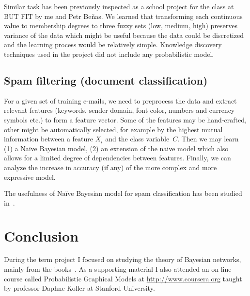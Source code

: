 \documentclass[english,cover]{fitthesis} %
\newcommand{\todo}[1]{{\color{red}#1}}
\begin{document}
Similar task has been previously inspected as a school project for the  class at BUT FIT by me and Petr Beňas. We learned that transforming each continuous value to membership degrees to three fuzzy sets (low, medium, high) preserves variance of the data which might be useful because the data could be discretized and the learning process would be relatively simple. Knowledge discovery techniques used in the project did not include any probabilistic model.


\section{Spam filtering (document classification)}
For a given set of training e-mails, we need to preprocess the data and extract relevant features (keywords, sender domain, font color, numbers and currency symbols etc.) to form a feature vector. Some of the features may be hand-crafted, other might be automatically selected, for example by the highest mutual information between a feature $X_i$ and the class variable~$C$. Then we may learn (1) a Naïve Bayesian model, (2) an extension of the naive model which also allows for a limited degree of dependencies between features. Finally, we can analyze the increase in accuracy (if any) of the more complex and more expressive model.

The usefulness of Naïve Bayesian model for spam classification has been studied in~\cite{heckerman98_spam}.

\chapter{Conclusion}
During the term project I focused on studying the theory of Bayesian networks, mainly from the books~\cite{pgm,russell_norvig_ed2}. As a supporting material I also attended an on-line course called Probabilistic Graphical Models at \url{http://www.coursera.org} taught by professor Daphne Koller at Stanford University.
\end{document}
